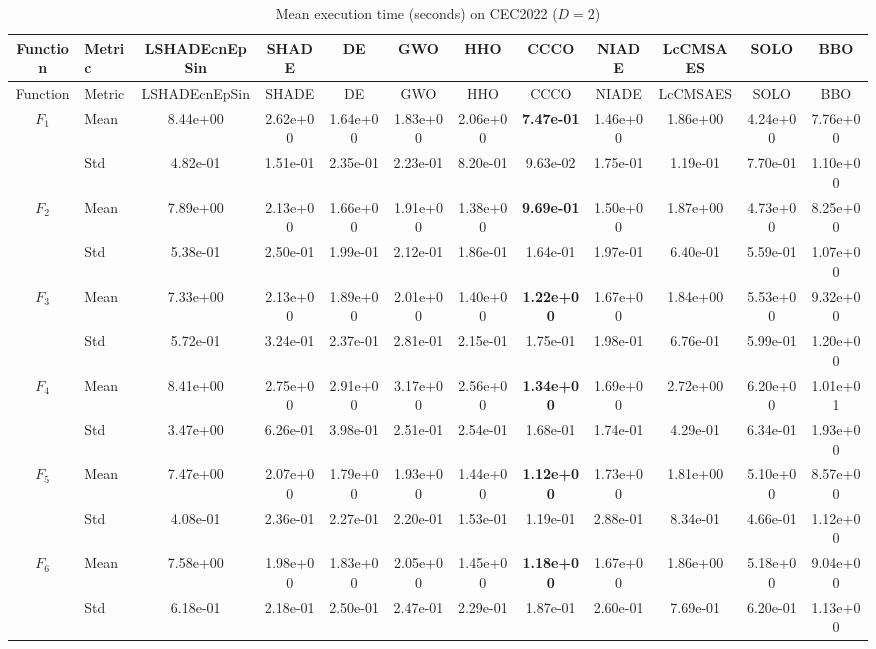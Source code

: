 \begin{center}
\small
\renewcommand{\arraystretch}{1.25}
\begin{longtable}{clcccccccccc}
\caption{Mean execution time (seconds) on CEC2022 ($D=2$) }
\label{tab:time_CEC2022_2} \\
\toprule
Function & Metric & LSHADEcnEpSin & SHADE & DE & GWO & HHO & CCCO & NIADE & LcCMSAES & SOLO & BBO \\
\midrule
\endfirsthead
\toprule
Function & Metric & LSHADEcnEpSin & SHADE & DE & GWO & HHO & CCCO & NIADE & LcCMSAES & SOLO & BBO \\
\midrule
\endhead
$F_{1}$ & Mean & 8.44e+00 & 2.62e+00 & 1.64e+00 & 1.83e+00 & 2.06e+00 & \textbf{7.47e-01} & 1.46e+00 & 1.86e+00 & 4.24e+00 & 7.76e+00 \\
 & Std & 4.82e-01 & 1.51e-01 & 2.35e-01 & 2.23e-01 & 8.20e-01 & 9.63e-02 & 1.75e-01 & 1.19e-01 & 7.70e-01 & 1.10e+00 \\
\midrule
$F_{2}$ & Mean & 7.89e+00 & 2.13e+00 & 1.66e+00 & 1.91e+00 & 1.38e+00 & \textbf{9.69e-01} & 1.50e+00 & 1.87e+00 & 4.73e+00 & 8.25e+00 \\
 & Std & 5.38e-01 & 2.50e-01 & 1.99e-01 & 2.12e-01 & 1.86e-01 & 1.64e-01 & 1.97e-01 & 6.40e-01 & 5.59e-01 & 1.07e+00 \\
\midrule
$F_{3}$ & Mean & 7.33e+00 & 2.13e+00 & 1.89e+00 & 2.01e+00 & 1.40e+00 & \textbf{1.22e+00} & 1.67e+00 & 1.84e+00 & 5.53e+00 & 9.32e+00 \\
 & Std & 5.72e-01 & 3.24e-01 & 2.37e-01 & 2.81e-01 & 2.15e-01 & 1.75e-01 & 1.98e-01 & 6.76e-01 & 5.99e-01 & 1.20e+00 \\
\midrule
$F_{4}$ & Mean & 8.41e+00 & 2.75e+00 & 2.91e+00 & 3.17e+00 & 2.56e+00 & \textbf{1.34e+00} & 1.69e+00 & 2.72e+00 & 6.20e+00 & 1.01e+01 \\
 & Std & 3.47e+00 & 6.26e-01 & 3.98e-01 & 2.51e-01 & 2.54e-01 & 1.68e-01 & 1.74e-01 & 4.29e-01 & 6.34e-01 & 1.93e+00 \\
\midrule
$F_{5}$ & Mean & 7.47e+00 & 2.07e+00 & 1.79e+00 & 1.93e+00 & 1.44e+00 & \textbf{1.12e+00} & 1.73e+00 & 1.81e+00 & 5.10e+00 & 8.57e+00 \\
 & Std & 4.08e-01 & 2.36e-01 & 2.27e-01 & 2.20e-01 & 1.53e-01 & 1.19e-01 & 2.88e-01 & 8.34e-01 & 4.66e-01 & 1.12e+00 \\
\midrule
$F_{6}$ & Mean & 7.58e+00 & 1.98e+00 & 1.83e+00 & 2.05e+00 & 1.45e+00 & \textbf{1.18e+00} & 1.67e+00 & 1.86e+00 & 5.18e+00 & 9.04e+00 \\
 & Std & 6.18e-01 & 2.18e-01 & 2.50e-01 & 2.47e-01 & 2.29e-01 & 1.87e-01 & 2.60e-01 & 7.69e-01 & 6.20e-01 & 1.13e+00 \\

\end{longtable}
\end{center}
